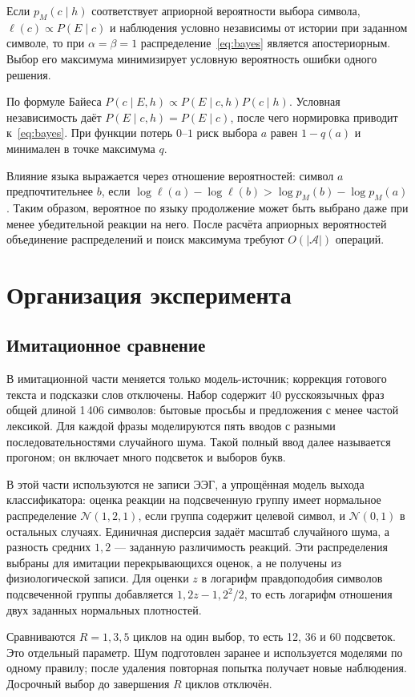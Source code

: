 \documentclass[11pt,a4paper]{article}
\begin{document}
Если $p_M(c\mid h)$ соответствует априорной вероятности выбора символа, $\ell(c)\propto P(E\mid c)$ и наблюдения условно независимы от истории при заданном символе, то при $\alpha=\beta=1$ распределение~\eqref{eq:bayes} является апостериорным. Выбор его максимума минимизирует условную вероятность ошибки одного решения.

По формуле Байеса $P(c\mid E,h)\propto P(E\mid c,h)P(c\mid h)$. Условная независимость даёт $P(E\mid c,h)=P(E\mid c)$, после чего нормировка приводит к~\eqref{eq:bayes}. При функции потерь $0$--$1$ риск выбора $a$ равен $1-q(a)$ и минимален в точке максимума $q$.

Влияние языка выражается через отношение вероятностей: символ $a$ предпочтительнее $b$, если $\log\ell(a)-\log\ell(b)>\log p_M(b)-\log p_M(a)$. Таким образом, вероятное по языку продолжение может быть выбрано даже при менее убедительной реакции на него. После расчёта априорных вероятностей объединение распределений и поиск максимума требуют $O(|\mathcal A|)$ операций.

\section{Организация эксперимента}
\subsection{Имитационное сравнение}
В имитационной части меняется только модель-источник; коррекция готового текста и подсказки слов отключены. Набор содержит 40 русскоязычных фраз общей длиной 1\,406 символов: бытовые просьбы и предложения с менее частой лексикой. Для каждой фразы моделируются пять вводов с разными последовательностями случайного шума. Такой полный ввод далее называется прогоном; он включает много подсветок и выборов букв.

В этой части используются не записи ЭЭГ, а упрощённая модель выхода классификатора: оценка реакции на подсвеченную группу имеет нормальное распределение $\mathcal N(1{,}2,1)$, если группа содержит целевой символ, и $\mathcal N(0,1)$ в остальных случаях. Единичная дисперсия задаёт масштаб случайного шума, а разность средних $1{,}2$ --- заданную различимость реакций. Эти распределения выбраны для имитации перекрывающихся оценок, а не получены из физиологической записи. Для оценки $z$ в логарифм правдоподобия символов подсвеченной группы добавляется $1{,}2z-1{,}2^2/2$, то есть логарифм отношения двух заданных нормальных плотностей.

Сравниваются $R=1,3,5$ циклов на один выбор, то есть 12, 36 и 60 подсветок. Это отдельный параметр. Шум подготовлен заранее и используется моделями по одному правилу; после удаления повторная попытка получает новые наблюдения. Досрочный выбор до завершения $R$ циклов отключён.
\end{document}
